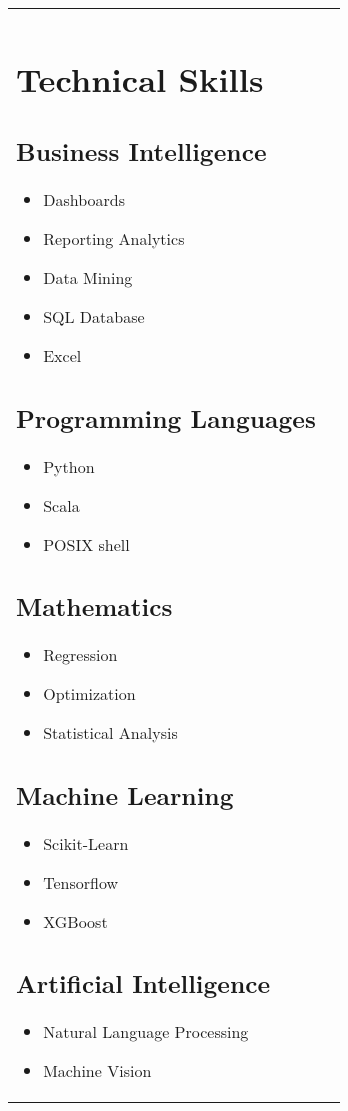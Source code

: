 \documentclass{article}
\begin{document}
\begin{tabular*}{7.5in}{ l | l}
	\begin{minipage}[t]{2.0in}
	\section*{Technical Skills}
	\subsection*{Business Intelligence}
	\begin{itemize}[noitemsep]
		\item Dashboards
		\item Reporting Analytics
		\item Data Mining
		\item SQL Database
		\item Excel
	\end{itemize}
	\subsection*{Programming Languages}	
	\begin{itemize}[noitemsep]
		\item Python
		\item Scala
		\item POSIX shell
	\end{itemize}
	\subsection*{Mathematics}
	\begin{itemize}[noitemsep]
		\item Regression
		\item Optimization 
		\item Statistical Analysis
	\end{itemize}
	\subsection*{Machine Learning}
	\begin{itemize}[noitemsep]
		\item Scikit-Learn	
		\item Tensorflow
		\item XGBoost
	\end{itemize}
	\subsection*{Artificial Intelligence}
	\begin{itemize}[noitemsep]
		\item Natural Language Processing
		\item Machine Vision
	\end{itemize}

\end{minipage}
\end{tabular*}
\end{document}
